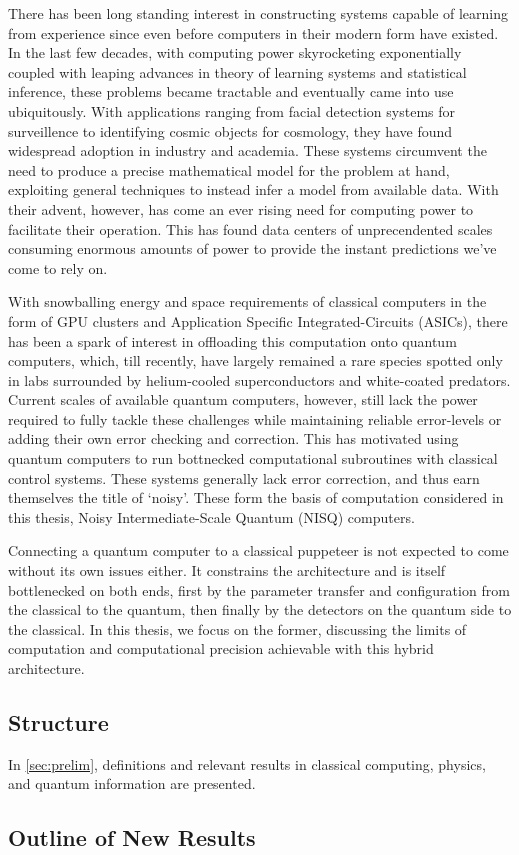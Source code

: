 
There has been long standing interest in constructing systems capable of
learning from experience since even before computers in their modern form have
existed. In the last few decades, with computing power skyrocketing
exponentially coupled with leaping advances in theory of learning systems and
statistical inference, these problems became tractable and eventually came into
use ubiquitously. With applications ranging from facial detection systems for
surveillence to identifying cosmic objects for cosmology, they have found
widespread adoption in industry and academia. These systems circumvent the need
to produce a precise mathematical model for the problem at hand, exploiting
general techniques to instead infer a model from available data. With their
advent, however, has come an ever rising need for computing power to facilitate
their operation. This has found data centers of unprecendented scales consuming
enormous amounts of power to provide the instant predictions we've come to rely
on.

With snowballing energy and space requirements of classical computers in the
form of GPU clusters and Application Specific Integrated-Circuits (ASICs), there
has been a spark of interest in offloading this computation onto quantum
computers, which, till recently, have largely remained a rare species spotted
only in labs surrounded by helium-cooled superconductors and white-coated
predators. Current scales of available quantum computers, however, still lack
the power required to fully tackle these challenges while maintaining reliable
error-levels or adding their own error checking and correction. This has
motivated using quantum computers to run bottnecked computational subroutines
with classical control systems. These systems generally lack error correction,
and thus earn themselves the title of `noisy'. These form the basis of
computation considered in this thesis, Noisy Intermediate-Scale Quantum (NISQ)
computers.

Connecting a quantum computer to a classical puppeteer is not expected to come
without its own issues either. It constrains the architecture and is itself
bottlenecked on both ends, first by the parameter transfer and configuration
from the classical to the quantum, then finally by the detectors on the quantum
side to the classical. In this thesis, we focus on the former, discussing the
limits of computation and computational precision achievable with this hybrid
architecture.

\subsection{Structure}
In \autoref{sec:prelim}, definitions and relevant results in classical
computing, physics, and quantum information are presented. 

\subsection{Outline of New Results}
